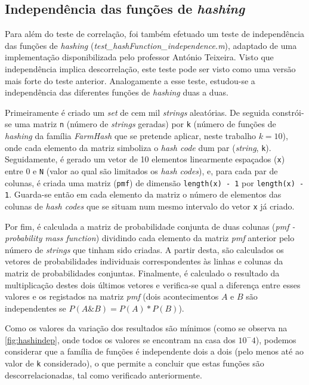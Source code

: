 \documentclass[a4paper,11pt,openright,oneside]{report}
\begin{document}
\subsection{Independência das funções de \textit{hashing}}
\label{subsec.hashindep}

Para além do teste de correlação, foi também efetuado um teste de independência das funções de \textit{hashing} (\textit{test\_hashFunction\_independence.m}), adaptado de uma implementação disponibilizada pelo professor António Teixeira. Visto que independência implica descorrelação, este teste pode ser visto como uma versão mais forte do teste anterior. Analogamente a esse teste, estudou-se a independência das diferentes funções de \textit{hashing} duas a duas.

Primeiramente é criado um \textit{set} de cem mil \textit{strings} aleatórias. De seguida constrói-se uma matriz \texttt{n} (número de \textit{strings} geradas) por \texttt{k} (número de funções de \textit{hashing} da família \textit{FarmHash} que se pretende aplicar, neste trabalho $k = 10$),  onde cada elemento da matriz simboliza o \textit{hash code} dum par (\textit{string}, \texttt{k}). Seguidamente, é gerado um vetor de 10 elementos linearmente espaçados (\texttt{x}) entre 0 e \texttt{N} (valor ao qual são limitados os \textit{hash codes}), e, para cada par de colunas, é criada uma matriz (\texttt{pmf}) de dimensão \verb|length(x) - 1| por \verb|length(x) - 1|. Guarda-se então em cada elemento da matriz o número de elementos das colunas de \textit{hash codes} que se situam num mesmo intervalo do vetor \texttt{x} já criado.

Por fim, é calculada a matriz de probabilidade conjunta de duas colunas (\textit{pmf - probability mass function}) dividindo cada elemento da matriz \textit{pmf} anterior pelo número de \textit{strings} que tinham sido criadas. A partir desta, são calculados os vetores de probabilidades individuais correspondentes às linhas e colunas da matriz de probabilidades conjuntas. Finalmente, é calculado o resultado da multiplicação destes dois últimos vetores e verifica-se qual a diferença entre esses valores e os registados na matriz \textit{pmf} (dois acontecimentos $A$ e $B$ são independentes se $P(A\&B) = P(A) * P(B)$).

Como os valores da variação dos resultados são mínimos (como se observa na \autoref{fig:hashindep}, onde todos os valores se encontram na casa dos $10^-4$), podemos considerar que a família de funções é independente dois a dois (pelo menos até ao valor de \texttt{k} considerado), o que permite a concluir que estas funções são descorrelacionadas, tal como verificado anteriormente.
\end{document}
